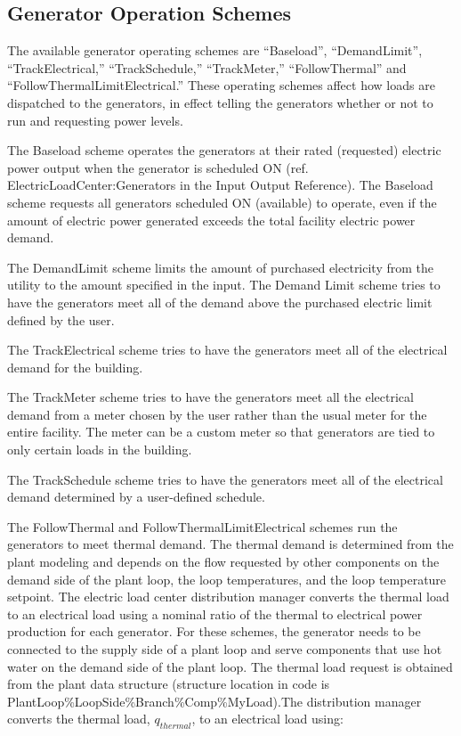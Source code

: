 \subsection{Generator Operation Schemes}

The available generator operating schemes are “Baseload”, “DemandLimit”, “TrackElectrical,” “TrackSchedule,” “TrackMeter,” “FollowThermal” and “FollowThermalLimitElectrical.”  These operating schemes affect how loads are dispatched to the generators, in effect telling the generators whether or not to run and requesting power levels.

The Baseload scheme operates the generators at their rated (requested) electric power output when the generator is scheduled ON (ref. ElectricLoadCenter:Generators in the Input Output Reference). The Baseload scheme requests all generators scheduled ON (available) to operate, even if the amount of electric power generated exceeds the total facility electric power demand.

The DemandLimit scheme limits the amount of purchased electricity from the utility to the amount specified in the input. The Demand Limit scheme tries to have the generators meet all of the demand above the purchased electric limit defined by the user.

The TrackElectrical scheme tries to have the generators meet all of the electrical demand for the building.

The TrackMeter scheme tries to have the generators meet all the electrical demand from a meter chosen by the user rather than the usual meter for the entire facility. The meter can be a custom meter so that generators are tied to only certain loads in the building.

The TrackSchedule scheme tries to have the generators meet all of the electrical demand determined by a user-defined schedule.

The FollowThermal and FollowThermalLimitElectrical schemes run the generators to meet thermal demand. The thermal demand is determined from the plant modeling and depends on the flow requested by other components on the demand side of the plant loop, the loop temperatures, and the loop temperature setpoint. The electric load center distribution manager converts the thermal load to an electrical load using a nominal ratio of the thermal to electrical power production for each generator. For these schemes, the generator needs to be connected to the supply side of a plant loop and serve components that use hot water on the demand side of the plant loop. The thermal load request is obtained from the plant data structure (structure location in code is PlantLoop\%LoopSide\%Branch\%Comp\%MyLoad).The distribution manager converts the thermal load, $q_{thermal}$, to an electrical load using:

